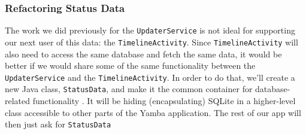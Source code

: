\begin{frame}[fragile]
\frametitle{Refactoring Status Data}
The work we did previously for the \texttt{UpdaterService} is not ideal for supporting our next
user of this data: the \texttt{TimelineActivity}. Since \texttt{TimelineActivity} will also need to access
the same database and fetch the same data, it would be better if we would share some
of the same functionality between the \texttt{UpdaterService} and the \texttt{TimelineActivity}.
In order to do that, we’ll create a new Java class, \texttt{StatusData}, and make it the common
container for database-related functionality . It will be hiding (encapsulating)
SQLite in a higher-level class accessible to other parts of the Yamba application.
The rest of our app will then just ask for \texttt{StatusData}
\end{frame}
